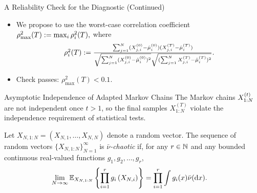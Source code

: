 \documentclass[10pt,xcolor=table]{beamer}
\begin{document}
\begin{frame}{A Reliability Check for the Diagnostic (Continued)}

\begin{itemize} 
    \item We propose to use the worst-case correlation coefficient
$
\rho^{2}_{\max}(T)
:= \max_{i} \rho^{2}_{i}(T),
$
where 
\[
\begin{aligned}
	\textstyle \rho^{2}_{i}(T)
	:=  \frac{\sum_{j=1}^{N} ( X_{j,i}^{(0)}-\hat{\mu}_{i}^{(0)})( X_{j,i}^{(T)}-\hat{\mu}_{i}^{(T)})}{\sqrt{\sum_{j=1}^{N}( X_{j,i}^{(0)}-\hat{\mu}_{i}^{(0)})^{2}} \sqrt{(\sum_{j=1}^{N} X_{j,i}^{(T)}-\hat{\mu}_{i}^{(T)})^{2}}}.
\end{aligned}
\]
    \item Check passes: $\rho^{2}_{\max}(T) < 0.1$.
\end{itemize}
\end{frame}

\begin{frame}{Asymptotic Independence of Adapted Markov Chains}
The Markov chains $X_{1:N}^{(t)}$ are not independent once $t > 1$, 
so the final samples $X_{1:N}^{(T)}$ violate the independence requirement of statistical tests. \pause
\begin{definition}
	Let $X_{N,1:N} = (X_{N,1}, \dots, X_{N,N})$ denote a random vector.
	The sequence of random vectors $\{ X_{N,1:N} \}_{N=1}^{\infty}$ is \emph{$\bar\nu$-chaotic} if, 
	for any $r \in \mathbb{N}$ and any bounded continuous real-valued functions $g_{1}, g_{2}, \ldots, g_{r}$,
	\[
	\begin{aligned}
		\lim _{N \rightarrow \infty}\mathbb{E}_{X_{N,1:N}}\left\{\prod_{i=1}^{r}g_{i}\left(X_{N,i}\right)\right\}
		&= \prod_{i=1}^{r} \int g_{i}(x) \bar\nu(\mathrm{d} x).
	\end{aligned}
	\]
\label{chaos definition}
\end{definition}
\end{frame}
\end{document}
